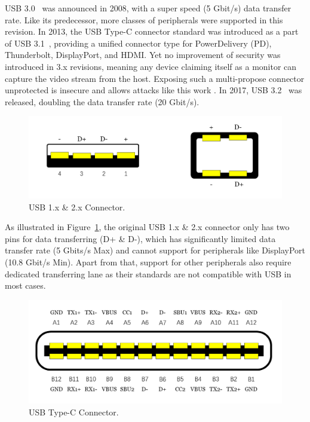 USB 3.0~\cite{usb30} was announced in 2008, with a super speed (5 Gbit/s) data
transfer rate. Like its predecessor, more classes of peripherals were supported
in this revision. In 2013, the USB Type-C connector standard was introduced as a
part of USB 3.1~\cite{usb31}, providing a unified connector type for
PowerDelivery (PD), Thunderbolt, DisplayPort, and HDMI.  Yet no improvement of
security was introduced in 3.x revisions, meaning any device claiming
itself as a monitor can capture the video stream from the host. Exposing
such a multi-propose connector unprotected is insecure and allows attacks like
this work \tool. In 2017, USB 3.2~\cite{usb32} was released, doubling the data
transfer rate (20 Gbit/s).

\begin{figure}[t]
    \centering
	\includegraphics[width=0.7\linewidth]{./Figs/usb_conn.png}
	\caption{USB 1.x \& 2.x Connector.}
	\label{fig:usb_conn}
\end{figure}

As illustrated in Figure~\ref{fig:usb_conn}, the original USB 1.x \& 2.x
connector only has two pins for data transferring (D+ \& D-), which has
significantly limited data transfer rate (5 Gbits/s Max) and cannot support for
peripherals like DisplayPort (10.8 Gbit/s Min). Apart from that, support for
other peripherals also require dedicated transferring lane as their standards
are not compatible with USB in most cases.  

\begin{figure}[t] 
	\centering
	\includegraphics[width=\linewidth]{./Figs/usb_c_conn.png} 
	\caption{USB Type-C Connector.} 
	\label{fig:usb_c_conn} 
\end{figure}

